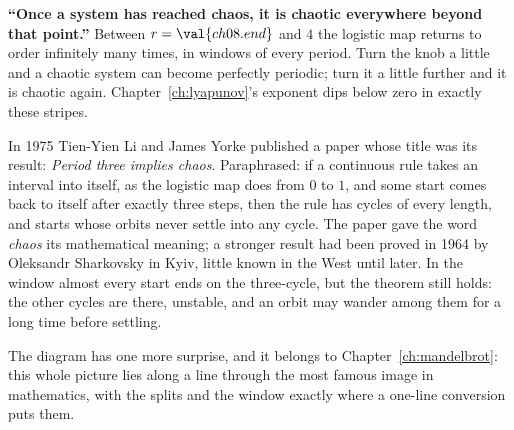
\begin{trapbox}
\textbf{\enquote{Once a system has reached chaos, it is chaotic everywhere
beyond that point.}} Between $r = \val{ch08.end}$ and $4$ the logistic map
returns to order infinitely many times, in windows of every period. Turn the
knob a little and a chaotic system can become perfectly periodic; turn it a
little further and it is chaotic again. Chapter~\ref{ch:lyapunov}'s exponent
dips below zero in exactly these stripes.
\end{trapbox}

\begin{note}
In 1975 Tien-Yien Li and James Yorke published a paper whose title was its
result: \emph{Period three implies chaos}. Paraphrased: if a continuous rule
takes an interval into itself, as the logistic map does from $0$ to $1$, and
some start comes back to itself after exactly three steps, then the rule has
cycles of every length, and starts whose orbits never settle into any cycle.
The paper gave the word \emph{chaos} its mathematical meaning; a stronger
result had been proved in 1964 by Oleksandr Sharkovsky in Kyiv, little known
in the West until later. In the window almost every start ends on the
three-cycle, but the theorem still holds: the other cycles are there,
unstable, and an orbit may wander among them for a long time before settling.
\end{note}

\noindent
The diagram has one more surprise, and it belongs to
Chapter~\ref{ch:mandelbrot}: this whole picture lies along a line through the
most famous image in mathematics, with the splits and the window exactly
where a one-line conversion puts them.

